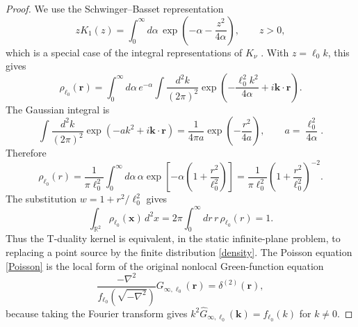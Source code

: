 \documentclass[openacc]{rsproca_new}%
\begin{document}
\begin{proof}
We use the Schwinger--Basset representation
\begin{equation}
  zK_1(z)=\int_0^\infty d\alpha\,
  \exp\left(-\alpha-\frac{z^2}{4\alpha}\right),
  \qquad z>0,
\end{equation}
which is a special case of the integral representations of $K_\nu$ \cite{DLMF}. With $z=\ell_0 k$, this gives
\begin{equation}
  \rho_{\ell_0}(\mathbf r)
  =\int_0^\infty d\alpha\,e^{-\alpha}
  \int\frac{d^2k}{(2\pi)^2}
  \exp\left(-\frac{\ell_0^2k^2}{4\alpha}+i\mathbf k\cdot\mathbf r\right).
\end{equation}
The Gaussian integral is
\begin{equation}\label{GE}
  \int\frac{d^2 k}{(2\pi)^2}\exp\left(-a k^2+i\mathbf k\cdot\mathbf r\right)
  =\frac{1}{4\pi a}\exp\left(-\frac{r^2}{4a}\right),
  \qquad a=\frac{\ell_0^2}{4\alpha}.
\end{equation}
Therefore
\begin{equation}
  \rho_{\ell_0}(r)
  =\frac{1}{\pi\ell_0^2}\int_0^\infty d\alpha\,\alpha
  \exp\left[-\alpha\left(1+\frac{r^2}{\ell_0^2}\right)\right]
  =\frac{1}{\pi\ell_0^2}\left(1+\frac{r^2}{\ell_0^2}\right)^{-2}.
\end{equation}
The substitution $w=1+r^2/\ell_0^2$ gives
\begin{equation}
  \int_{\mathbb R^2}\rho_{\ell_0}(\mathbf x)\,d^2x
  =2\pi\int_0^\infty dr\,r\,\rho_{\ell_0}(r)=1.
\end{equation}
Thus the T-duality kernel is equivalent, in the static infinite-plane problem, to replacing a point source by the finite distribution \eqref{density}. The Poisson equation \eqref{Poisson} is the local form of the original nonlocal Green-function equation
\begin{equation}
  \frac{-\nabla^2}{f_{\ell_0}(\sqrt{-\nabla^2})}G_{\infty,\ell_0}(\mathbf r)
  =\delta^{(2)}(\mathbf r),
\end{equation}
because taking the Fourier transform gives $k^2\widehat G_{\infty,\ell_0}(\mathbf k)=f_{\ell_0}(k)$ for $k\neq 0$.


\end{proof}
\end{document}
